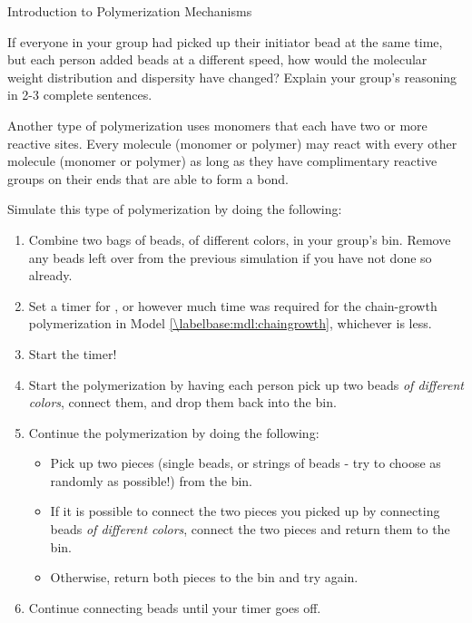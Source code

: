 \begin{activity}{Introduction to Polymerization Mechanisms}
\begin{ctqs}
		\begin{solution}[2in]
		\end{solution}
	
	\question If everyone in your group had picked up their initiator bead at the same time, but each person added beads at a different speed, how would the molecular weight distribution and dispersity have changed?  Explain your group's reasoning in 2-3 complete sentences.
	
		\begin{solution}[2in]
		\end{solution}
		
\end{ctqs}

\begin{model}
\label{\labelbase:mdl:stepgrowth}

	Another type of polymerization uses monomers that each have two or more reactive sites.  Every molecule (monomer or polymer) may react with every other molecule (monomer or polymer) as long as they have complimentary reactive groups on their ends that are able to form a bond.
	
	Simulate this type of polymerization by doing the following:
	\begin{enumerate}
		\item Combine two bags of beads, of different colors, in your group's bin.  Remove any beads left over from the previous simulation if you have not done so already.
		\item Set a timer for \timeallowed, or however much time was required for the chain-growth polymerization in Model \ref{\labelbase:mdl:chaingrowth}, whichever is less.
		\item Start the timer!
		\item Start the polymerization by having each person pick up two beads \emph{of different colors}, connect them, and drop them back into the bin.
		\item Continue the polymerization by doing the following:
			\begin{itemize}
				\item Pick up two pieces (single beads, or strings of beads - try to choose as randomly as possible!) from the bin.
				\item If it is possible to connect the two pieces you picked up by connecting beads \emph{of different colors}, connect the two pieces and return them to the bin.
				\item Otherwise, return both pieces to the bin and try again.
			\end{itemize}
		\item Continue connecting beads until your timer goes off.
	\end{enumerate}
	

\end{model}
\end{activity}
